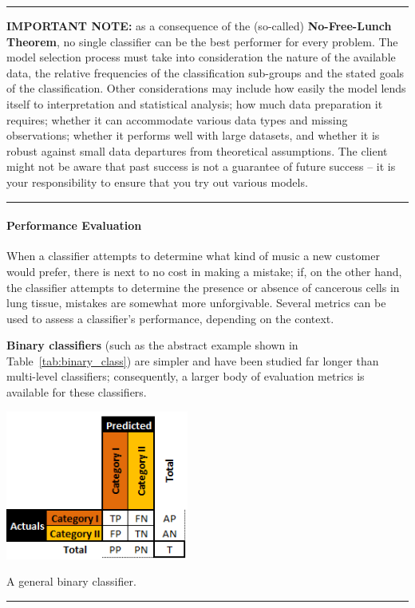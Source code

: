 \begin{center}
    \rule{0.5\textwidth}{.4pt}
\end{center} 
\textbf{IMPORTANT NOTE:} as a consequence of the (so-called) \textbf{No-Free-Lunch Theorem}, no single classifier can be the best performer for every problem. The model selection process must take into consideration the nature of the available data, the relative frequencies of the classification sub-groups and the stated goals of the classification. Other considerations may include how easily the model lends itself to interpretation and statistical analysis; how much data preparation it requires; whether it can accommodate various data types and missing observations; whether it performs well with large datasets, and whether it is robust against small data departures from theoretical assumptions. The client might not be aware that past success is not a guarantee of future success -- it is your responsibility to ensure that you try out various models.  
\begin{center}
    \rule{0.5\textwidth}{.4pt}
\end{center} \paragraph{Performance Evaluation}
When a classifier attempts to determine what kind of music a new customer would prefer, there is next to no cost in making a mistake; if, on the other hand, the classifier attempts to determine the presence or absence of cancerous cells in lung tissue, mistakes are somewhat more unforgivable. Several metrics can be used to assess a classifier's performance, depending on the context. \par \textbf{Binary classifiers} (such as the abstract example shown in Table~\ref{tab:binary_class}) are simpler and have been studied far longer than multi-level classifiers; consequently, a larger body of evaluation metrics is available for these classifiers. 
\begin{table}[!t] \begin{center}
    \includegraphics[width=0.45\textwidth]{images/DSML/binary_classifier}
  \end{center}
  \caption{\small A general binary classifier.}\hrule
  \label{tab:binary_class}
\end{table}
